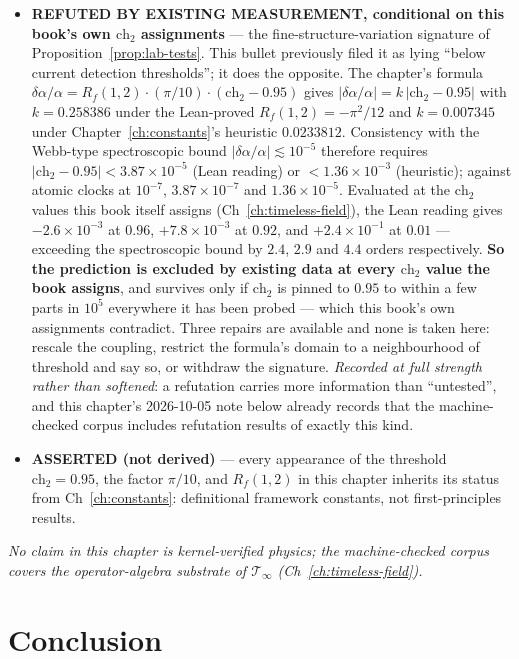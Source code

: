 \begin{itemize}
\item \textbf{REFUTED BY EXISTING MEASUREMENT, conditional on this book's own $\text{ch}_2$ assignments} --- the fine-structure-variation signature of Proposition~\ref{prop:lab-tests}. This bullet previously filed it as lying ``below current detection thresholds''; it does the opposite. The chapter's formula $\delta\alpha/\alpha = R_f(1,2)\cdot(\pi/10)\cdot(\text{ch}_2-0.95)$ gives $|\delta\alpha/\alpha| = k\,|\text{ch}_2-0.95|$ with $k=0.258386$ under the Lean-proved $R_f(1,2)=-\pi^2/12$ and $k=0.007345$ under Chapter~\ref{ch:constants}'s heuristic $0.0233812$. Consistency with the Webb-type spectroscopic bound $|\delta\alpha/\alpha|\lesssim10^{-5}$ therefore requires $|\text{ch}_2-0.95| < 3.87\times10^{-5}$ (Lean reading) or $<1.36\times10^{-3}$ (heuristic); against atomic clocks at $10^{-7}$, $3.87\times10^{-7}$ and $1.36\times10^{-5}$. Evaluated at the $\text{ch}_2$ values this book itself assigns (Ch~\ref{ch:timeless-field}), the Lean reading gives $-2.6\times10^{-3}$ at $0.96$, $+7.8\times10^{-3}$ at $0.92$, and $+2.4\times10^{-1}$ at $0.01$ --- exceeding the spectroscopic bound by $2.4$, $2.9$ and $4.4$ orders respectively. \textbf{So the prediction is excluded by existing data at every $\text{ch}_2$ value the book assigns}, and survives only if $\text{ch}_2$ is pinned to $0.95$ to within a few parts in $10^5$ everywhere it has been probed --- which this book's own assignments contradict. Three repairs are available and none is taken here: rescale the coupling, restrict the formula's domain to a neighbourhood of threshold and say so, or withdraw the signature. \emph{Recorded at full strength rather than softened}: a refutation carries more information than ``untested'', and this chapter's 2026-10-05 note below already records that the machine-checked corpus includes refutation results of exactly this kind.
\item \textbf{ASSERTED (not derived)} --- every appearance of the threshold $\text{ch}_2=0.95$, the factor $\pi/10$, and $R_f(1,2)$ in this chapter inherits its status from Ch~\ref{ch:constants}: definitional framework constants, not first-principles results.
\end{itemize}
\emph{No claim in this chapter is kernel-verified physics; the machine-checked corpus covers the operator-algebra substrate of $\mathcal{T}_\infty$ (Ch~\ref{ch:timeless-field}).}

\section{Conclusion}

